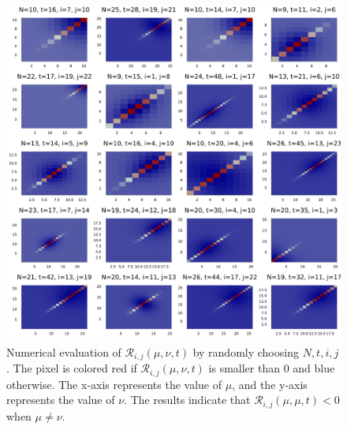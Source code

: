 \documentclass[journal=jctcce,a4paper,manuscript=article]{achemso}
\begin{document}
\begin{figure}[t]
  \centering
  \includegraphics[width=\linewidth]{figures/appendix/assumption.pdf}
  \caption{ Numerical evaluation of  $\mathscr{R}_{i, j}(\mu, \nu, t)$ by randomly choosing $N, t, i, j$. The pixel is colored red if $\mathscr{R}_{i, j}(\mu, \nu, t)$ is smaller than 0 and blue otherwise. The x-axis represents the value of $\mu$, and the y-axis represents the value of $\nu$. The results indicate that $\mathscr{R}_{i, j}(\mu, \mu, t)<0$ when $\mu\neq\nu$.}
  \label{fig: appendix assumption}
\end{figure}
\end{document}
